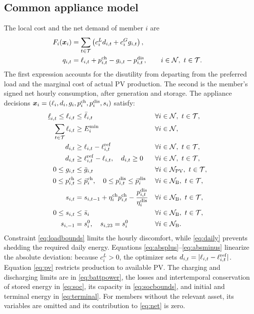 \documentclass[10pt,a4paper]{article}
\begin{document}
\subsection{Common appliance model}
The local cost and the net demand of member $i$ are
\begin{align}
F_i(\bm x_i)&=\sum_{t\in\mathcal T}\left(c_i^L d_{i,t}+c_i^G g_{i,t}\right), \label{eq:localcost}\\
q_{i,t}&=\ell_{i,t}+p_{i,t}^{\rm ch}-g_{i,t}-p_{i,t}^{\rm dis},\qquad i\in\mathcal N,\ t\in\mathcal T. \label{eq:net}
\end{align}
The first expression accounts for the disutility from departing from the preferred load and the marginal cost of actual PV production. The second is the member's signed net hourly consumption, after generation and storage. The appliance decisions $\bm x_i=(\ell_i,d_i,g_i,p_i^{\rm ch},p_i^{\rm dis},s_i)$ satisfy:
\begin{subequations}\label{eq:appliances}
\begin{align}
\underline\ell_{i,t}\leq\ell_{i,t}&\leq\bar\ell_{i,t}
    &&\forall i\in\mathcal N,\ t\in\mathcal T, \label{eq:loadbounds}\\
\sum_{t\in\mathcal T}\ell_{i,t}&\geq E_i^{\min}
    &&\forall i\in\mathcal N, \label{eq:daily}\\
d_{i,t}&\geq\ell_{i,t}-\ell^{\rm ref}_{i,t}
    &&\forall i\in\mathcal N,\ t\in\mathcal T, \label{eq:absplus}\\
d_{i,t}&\geq\ell^{\rm ref}_{i,t}-\ell_{i,t},\quad d_{i,t}\geq0
    &&\forall i\in\mathcal N,\ t\in\mathcal T, \label{eq:absminus}\\
0\leq g_{i,t}&\leq\bar g_{i,t}
    &&\forall i\in\mathcal N_{\rm PV},\ t\in\mathcal T, \label{eq:pv}\\
0\leq p_{i,t}^{\rm ch}&\leq\bar p_i^{\rm ch},\quad
0\leq p_{i,t}^{\rm dis}\leq\bar p_i^{\rm dis}
    &&\forall i\in\mathcal N_{\rm B},\ t\in\mathcal T, \label{eq:battpower}\\
s_{i,t}&=s_{i,t-1}+\eta_i^{\rm ch}p_{i,t}^{\rm ch}
            -\frac{p_{i,t}^{\rm dis}}{\eta_i^{\rm dis}}
    &&\forall i\in\mathcal N_{\rm B},\ t\in\mathcal T, \label{eq:soc}\\
0\leq s_{i,t}&\leq\bar s_i
    &&\forall i\in\mathcal N_{\rm B},\ t\in\mathcal T, \label{eq:socbounds}\\
s_{i,-1}&=s_i^0,\quad s_{i,23}=s_i^0
    &&\forall i\in\mathcal N_{\rm B}. \label{eq:terminal}
\end{align}
\end{subequations}
Constraint \eqref{eq:loadbounds} limits the hourly discomfort, while \eqref{eq:daily} prevents shedding the required daily energy. Equations \eqref{eq:absplus}--\eqref{eq:absminus} linearize the absolute deviation: because $c_i^L>0$, the optimizer sets $d_{i,t}=|\ell_{i,t}-\ell^{\rm ref}_{i,t}|$. Equation \eqref{eq:pv} restricts production to available PV. The charging and discharging limits are in \eqref{eq:battpower}, the losses and intertemporal conservation of stored energy in \eqref{eq:soc}, its capacity in \eqref{eq:socbounds}, and initial and terminal energy in \eqref{eq:terminal}. For members without the relevant asset, its variables are omitted and its contribution to \eqref{eq:net} is zero.
\end{document}
